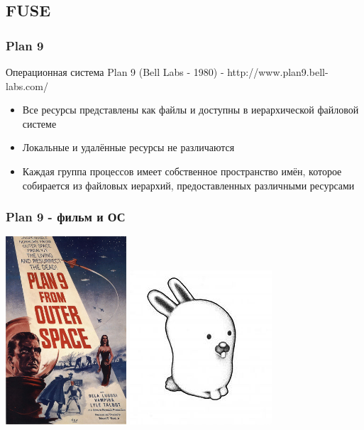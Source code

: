 \documentclass{beamer}
\begin{document}
\subsection{FUSE}
\begin{frame}
\frametitle{Plan 9}
Операционная система Plan 9 (Bell Labs - 1980) -
http://www.plan9.bell-labs.com/

\begin{itemize}
  \item<1> Все ресурсы представлены как файлы и доступны в иерархической
  файловой системе
  \item<1> Локальные и удалённые ресурсы не различаются
  \item<1> Каждая группа процессов имеет собственное пространство имён,
  которое собирается из файловых иерархий, предоставленных
  различными ресурсами
\end{itemize}
\end{frame}

\begin{frame}
\frametitle{Plan 9 - фильм и ОС}
\includegraphics[width=4.5cm]{plan9_film.jpg}
\includegraphics[width=5.3cm]{plan9_os.jpg}

\end{frame}
\end{document}
